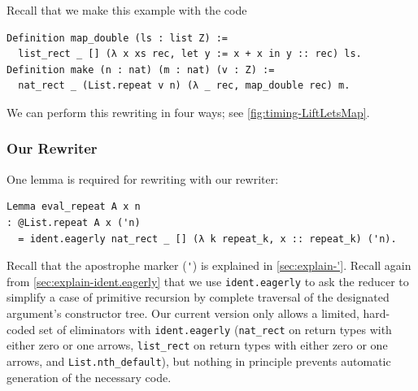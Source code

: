 \begin{subappendices}
Recall that we make this example with the code
\begin{verbatim}
Definition map_double (ls : list Z) :=
  list_rect _ [] (λ x xs rec, let y := x + x in y :: rec) ls.
Definition make (n : nat) (m : nat) (v : Z) :=
  nat_rect _ (List.repeat v n) (λ _ rec, map_double rec) m.
\end{verbatim}

We can perform this rewriting in four ways; see \autoref{fig:timing-LiftLetsMap}.

\subsubsection{Our Rewriter}
One lemma is required for rewriting with our rewriter:
\begin{verbatim}
Lemma eval_repeat A x n
: @List.repeat A x ('n)
  = ident.eagerly nat_rect _ [] (λ k repeat_k, x :: repeat_k) ('n).
\end{verbatim}
Recall that the apostrophe marker (\verb|'|) is explained in \autoref{sec:explain-'}.
Recall again from \autoref{sec:explain-ident.eagerly} that we use \texttt{ident.eagerly} to ask the reducer to simplify a case of primitive recursion by complete traversal of the designated argument's constructor tree.
Our current version only allows a limited, hard-coded set of eliminators with \texttt{ident.eagerly} (\texttt{nat\_rect} on return types with either zero or one arrows, \texttt{list\_rect} on return types with either zero or one arrows, and \texttt{List.nth\_default}), but nothing in principle prevents automatic generation of the necessary code.


\end{subappendices}
